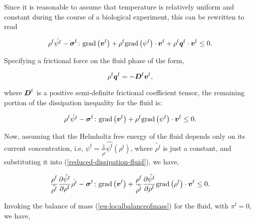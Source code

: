 Since it is reasonable to assume that temperature is relatively
uniform and constant during the course of a biological experiment,
this can be rewritten to read 

\begin{equation*}
\rho^{\mathrm{f}}
\dot{\psi^{\mathrm{f}}} -\mbox{\boldmath$\sigma$}^{\mathrm{f}}\colon\mathrm{grad}\left(\mbox{\boldmath$ v$}^{\mathrm{f}}\right)+
\rho^{\mathrm{f}} \mathrm{grad}\left(\psi^{\mathrm{f}}\right)
\cdot\mbox{\boldmath$ v$}^{\mathrm{f}}
+\rho^{\mathrm{f}} \mbox{\boldmath$ q$}^{\mathrm{f}}\cdot\mbox{\boldmath$ v$}^{\mathrm{f}}
\leq 0.
\end{equation*}

\noindent Specifying a frictional force on the fluid phase of the
form,

\begin{equation}
\rho^{\mathrm{f}} \mbox{\boldmath$ q$}^{\mathrm{f}} = - \mbox{\boldmath$ D$}^{\mathrm{f}}
\mbox{\boldmath$ v$}^{\mathrm{f}},
\label{eu-force-rel-fluid}
\end{equation}

\noindent where  $\mbox{\boldmath$ D$}^{\mathrm{f}}$ is a positive semi-definite
frictional coefficient tensor, the remaining portion of the
dissipation inequality for the fluid is:

\begin{equation*}
\rho^{\mathrm{f}}
\dot{\psi^{\mathrm{f}}} -\mbox{\boldmath$\sigma$}^{\mathrm{f}}\colon\mathrm{grad}\left(\mbox{\boldmath$ v$}^{\mathrm{f}}\right)+
\rho^{\mathrm{f}} \mathrm{grad}\left(\psi^{\mathrm{f}}\right)
\cdot\mbox{\boldmath$ v$}^{\mathrm{f}}
\leq 0.
\end{equation*}

Now, assuming that the Helmholtz free energy of the fluid depends only
on its current concentration, i.e, $\psi^{\mathrm{f}} =
\frac{1}{\tilde{\rho^{\mathrm{f}}}} \hat{\psi^{\mathrm{f}}}
(\rho^{\mathrm{f}})$, where $\tilde{\rho^{\mathrm{f}}}$ is just a
constant, and substituting it into (\ref{reduced-dissipation-fluid}),
we have,

\begin{equation*}
\frac{\rho^{\mathrm{f}}}{\tilde{\rho^{\mathrm{f}}}}
\frac{\partial \hat{\psi^{\mathrm{f}}}}{\partial \rho^{\mathrm{f}}}
\dot{\rho^{\mathrm{f}}}
-\mbox{\boldmath$\sigma$}^{\mathrm{f}}\colon\mathrm{grad}
\left(\mbox{\boldmath$ v$}^{\mathrm{f}}\right) +
\frac{\rho^{\mathrm{f}}}{\tilde{\rho^{\mathrm{f}}}}
\frac{\partial \hat{\psi^{\mathrm{f}}}}{\partial \rho^{\mathrm{f}}}
\mathrm{grad}\left(\rho^{\mathrm{f}}\right) 
\cdot\mbox{\boldmath$ v$}^{\mathrm{f}}
\leq 0.
\end{equation*}

\noindent Invoking the balance of mass (\ref{eu-localbalanceofmass})
for the fluid, with $\pi^\mathrm{f} = 0$, we have,

